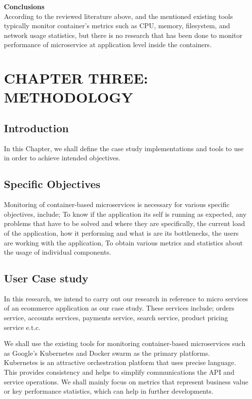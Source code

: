 \documentclass{article}
\begin{document}
 
 \textbf{Conclusions} \\
 According to the reviewed literature above, and the mentioned existing tools typically monitor container’s metrics such as CPU, memory, filesystem, and network usage statistics, but there is no research that has been done to monitor performance of microservice at application level inside the containers.

\clearpage

\section{CHAPTER THREE: METHODOLOGY}

\subsection{Introduction}
In this Chapter, we shall define the case study implementations and tools to use in order to achieve intended objectives. 
\subsection{Specific Objectives}
Monitoring of container-based microservices is necessary for various specific objectives, include; 
To know if the application its self is running as expected, any problems that have to be solved and where they are specifically, the current load of the application, how it performing and what is are its bottlenecks, the users are working with the application, To obtain various metrics and statistics about the usage of individual components.
\subsection{User Case study}
In this research, we intend to carry out our research in reference to micro services of an ecommerce application as our case study. These services include; orders service, accounts services, payments service, search service, product pricing service e.t.c.

We shall use the existing tools for monitoring container-based microservices such as Google’s Kubernetes and Docker swarm as the primary platforms.\\
Kubernetes is an attractive orchestration platform that uses precise language. This provides consistency and helps to simplify communications the API and service operations.
 We shall mainly focus on metrics that represent business value or key performance statistics, which can help in further developments.
\end{document}

